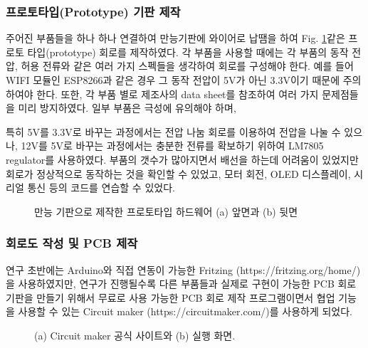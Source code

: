 \clearpage
\subsubsection{프로토타입(Prototype) 기판 제작}

주어진 부품들을 하나 하나 연결하여 만능기판에 와이어로 납땜을 하여 Fig. \ref{fig:prototype}\과 같은 프로토 타입(prototype) 회로를 제작하였다. 각 부품을 사용할 때에는 각 부품의 동작 전압, 허용 전류와 같은 여러 가지 스펙들을 생각하여 회로를 구성해야 한다. 예를 들어 WIFI 모듈인 ESP8266과 같은 경우 그 동작 전압이 5V가 아닌 3.3V이기 때문에 주의하여야 한다. 또한, 각 부품 별로 제조사의 data sheet를 참조하여 여러 가지 문제점들을 미리 방지하였다. 일부 부품은 극성에 유의해야 하며, 

특히 5V를 3.3V로 바꾸는 과정에서는 전압 나눔 회로를 이용하여 전압을 나눌 수 있으나, 12V를 5V로 바꾸는 과정에서는 충분한 전류를 확보하기 위하여 LM7805 regulator를 사용하였다. 부품의 갯수가 많아지면서 배선을 하는데 어려움이 있었지만 회로가 정상적으로 동작하는 것을 확인할 수 있었고, 모터 회전, OLED 디스플레이, 시리얼 통신 등의 코드를 연습할 수 있었다.

\begin{figure}[h]
	\begin{center}
		\caption{만능 기판으로 제작한 프로토타입 하드웨어 (a) 앞면과 (b) 뒷면}
		\label{fig:prototype}
	\end{center}
\end{figure}

\subsubsection{회로도 작성 및 PCB 제작}

연구 초반에는 Arduino와 직접 연동이 가능한 Fritzing (https://fritzing.org/home/)을 사용하였지만, 연구가 진행될수록 다른 부품들과 실제로 구현이 가능한 PCB 회로기판을 만들기 위해서 무료로 사용 가능한 PCB 회로 제작 프로그램이면서 협업 기능을 사용할 수 있는 Circuit maker (https://circuitmaker.com/)를 사용하게 되었다. 

\begin{figure}[h]
	\begin{center}
	\end{center}
	\caption{(a) Circuit maker 공식 사이트와 (b) 실행 화면.}
	\label{fig:circuit_maker}
\end{figure}

